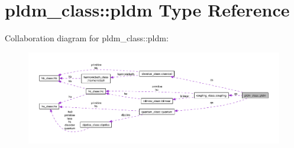 \hypertarget{structpldm__class_1_1pldm}{}\section{pldm\+\_\+class\+:\+:pldm Type Reference}
\label{structpldm__class_1_1pldm}


Collaboration diagram for pldm\+\_\+class\+:\+:pldm\+:\nopagebreak
\begin{figure}[H]
\begin{center}
\leavevmode
\includegraphics[width=350pt]{structpldm__class_1_1pldm__coll__graph}
\end{center}
\end{figure}
